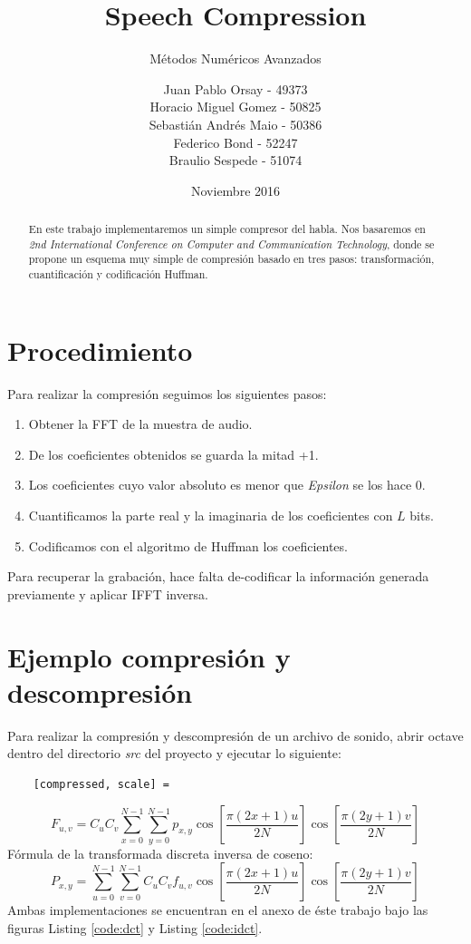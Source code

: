 \documentclass[spanish]{scrartcl}
\subtitle{Métodos Numéricos Avanzados}
\title{Speech Compression}
\author{
Juan Pablo Orsay - 49373 \\
Horacio Miguel Gomez - 50825 \\
Sebastián Andrés Maio - 50386 \\
Federico Bond - 52247 \\
Braulio Sespede - 51074
}
\date{Noviembre 2016}
\let\endtitlepage\relax
\begin{document}
\maketitle
\endtitlepage

\begin{abstract}
En este trabajo implementaremos un simple compresor del habla. Nos basaremos en \textit{2nd International Conference on Computer and Communication Technology}, donde se propone un esquema muy simple de compresión basado en tres pasos: transformación, cuantificación y codificación Huffman.
\end{abstract}
\break
\tableofcontents
\break
\section{Procedimiento}
Para realizar la compresión seguimos los siguientes pasos:
\begin{enumerate}
\item Obtener la FFT de la muestra de audio.
\item De los coeficientes obtenidos se guarda la mitad +1.
\item Los coeficientes cuyo valor absoluto es menor que \textit{Epsilon} se los hace 0.
\item Cuantificamos la parte real y la imaginaria de los coeficientes con $L$ bits.
\item Codificamos con el algoritmo de Huffman los coeficientes.
\end{enumerate}
Para recuperar la grabación, hace falta de-codificar la información generada previamente y aplicar IFFT inversa.
\section{Ejemplo compresión y descompresión}
Para realizar la compresión y descompresión de un archivo de sonido, abrir octave dentro del directorio \textit{src} del proyecto y ejecutar lo siguiente:
\begin{lstlisting}
    [compressed, scale] = 
\end{lstlisting}
\begin{equation}
\label{eq:dct}
F_{u,v} =
 C_{u} C_{v} \sum_{x=0}^{N-1}
 \sum_{y=0}^{N-1}
 p_{x,y}
\cos \left[\frac{\pi \left(2 x + 1\right) u}{2 N} \right]
\cos \left[\frac{\pi \left(2 y + 1\right) v}{2 N} \right]
\end{equation}
Fórmula de la transformada discreta inversa de coseno\cite{mathworks_DCT}:
\begin{equation}
\label{eq:idct}
P_{x,y} =
 \sum_{u=0}^{N-1}
 \sum_{v=0}^{N-1}
 C_{u} C_{v}
 f_{u,v}
\cos \left[\frac{\pi \left(2 x + 1\right) u}{2 N} \right]
\cos \left[\frac{\pi \left(2 y + 1\right) v}{2 N} \right]
\end{equation}
Ambas implementaciones se encuentran en el anexo de éste trabajo bajo las figuras Listing \ref{code:dct} y Listing \ref{code:idct}.
\end{document}
